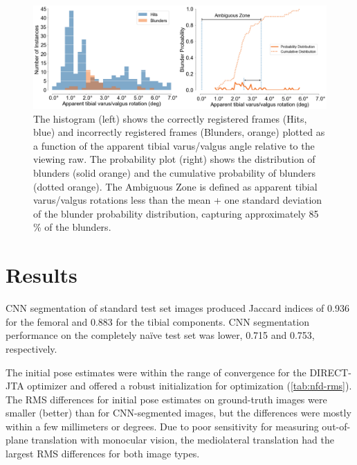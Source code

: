 \begin{figure}[hb]
	\centering
	\includegraphics[width = \linewidth]{figs/jtml-paper/fig5-histo.png}
	\caption{The histogram (left) shows the correctly registered frames (Hits, blue) and incorrectly registered frames  (Blunders, orange) plotted as a function of the apparent tibial varus/valgus angle relative to the viewing raw. The probability plot (right) shows the distribution of blunders (solid orange) and the cumulative probability of blunders (dotted orange). The Ambiguous Zone is defined as apparent tibial varus/valgus rotations less than the mean + one standard deviation of the blunder probability distribution, capturing approximately 85 \% of the blunders.}
	\label{fig:histo-pdf}
\end{figure}


\section{Results}
\label{sec:jtml-results}
CNN segmentation of standard test set images produced Jaccard indices of 0.936 for the femoral and 0.883 for the tibial components. CNN segmentation performance on the completely naïve test set was lower, 0.715 and 0.753, respectively.

The initial pose estimates were within the range of convergence for the DIRECT-JTA optimizer and offered a robust initialization for optimization (\cref{tab:nfd-rms}).
The RMS differences for initial pose estimates on ground-truth images were smaller (better) than for CNN-segmented images, but the differences were mostly within a few millimeters or degrees.
Due to poor sensitivity for measuring out-of-plane translation with monocular vision, the mediolateral translation had the largest RMS differences for both image types.


